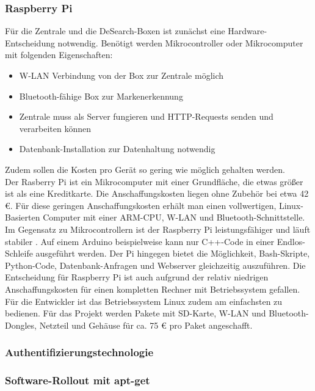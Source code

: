\subsubsection{Raspberry Pi}
Für die Zentrale und die DeSearch-Boxen ist zunächst eine Hardware-Entscheidung notwendig. Benötigt werden Mikrocontroller oder Mikrocomputer mit folgenden Eigenschaften:
\begin{itemize}
	\item W-LAN Verbindung von der Box zur Zentrale möglich
	\item Bluetooth-fähige Box zur Markenerkennung
	\item Zentrale muss als Server fungieren und HTTP-Requests senden und verarbeiten können
	\item Datenbank-Installation zur Datenhaltung notwendig
\end{itemize}
Zudem sollen die Kosten pro Gerät so gering wie möglich gehalten werden. \\
Der Rasberry Pi ist ein Mikrocomputer mit einer Grundfläche, die etwas größer ist als eine Kreditkarte. Die Anschaffungskosten liegen ohne Zubehör bei etwa 42 €. Für diese geringen Anschaffungskosten erhält man einen vollwertigen, Linux-Basierten Computer mit einer ARM-CPU, W-LAN und Bluetooth-Schnittstelle. Im Gegensatz zu Mikrocontrollern ist der Raspberry Pi leistungsfähiger und läuft stabiler \citep[Vgl.][S.35ff.]{raspi}. Auf einem Arduino beispielweise kann nur C++-Code in einer Endlos-Schleife ausgeführt werden. Der Pi hingegen bietet die Möglichkeit, Bash-Skripte, Python-Code, Datenbank-Anfragen und Webserver gleichzeitig auszuführen. Die Entscheidung für Raspberry Pi ist auch aufgrund der relativ niedrigen Anschaffungskosten für einen kompletten Rechner mit Betriebssystem gefallen. Für die Entwickler ist das Betriebssystem Linux zudem am einfachsten zu bedienen. Für das Projekt werden Pakete mit SD-Karte, W-LAN und Bluetooth-Dongles, Netzteil und Gehäuse für ca. 75 € pro Paket angeschafft.
\subsubsection{Authentifizierungstechnologie}
\subsubsection{Software-Rollout mit apt-get}
